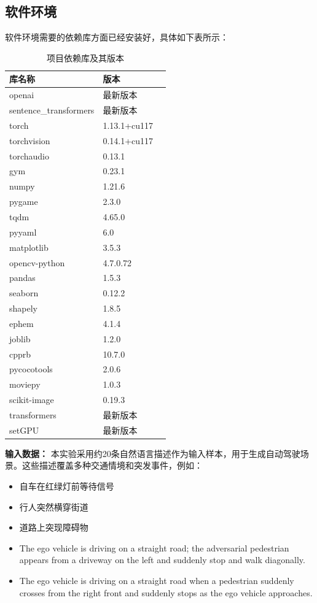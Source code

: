 \subsection*{软件环境}
软件环境需要的依赖库方面已经安装好，具体如下表所示：
	\begin{table}[H]
		\centering
			\begin{tabular}{lll}
			\hline
			\textbf{库名称} & \textbf{版本} \\
			\hline
			openai & 最新版本 \\
			sentence\_transformers & 最新版本 \\
			torch & 1.13.1+cu117 \\
			torchvision & 0.14.1+cu117 \\
			torchaudio & 0.13.1 \\
			gym & 0.23.1 \\
			numpy & 1.21.6 \\
			pygame & 2.3.0 \\
			tqdm & 4.65.0 \\
			pyyaml & 6.0 \\
			matplotlib & 3.5.3 \\
			opencv-python & 4.7.0.72 \\
			pandas & 1.5.3 \\
			seaborn & 0.12.2 \\
			shapely & 1.8.5 \\
			ephem & 4.1.4 \\
			joblib & 1.2.0 \\
			cpprb & 10.7.0 \\
			pycocotools & 2.0.6 \\
			moviepy & 1.0.3 \\
			scikit-image & 0.19.3 \\
			transformers & 最新版本 \\
			setGPU & 最新版本 \\
			\hline
		\end{tabular}
		\caption{项目依赖库及其版本}
		\label{tab:dependencies}
	\end{table}
	
\textbf{输入数据：} 本实验采用约20条自然语言描述作为输入样本，用于生成自动驾驶场景。这些描述覆盖多种交通情境和突发事件，例如：

\begin{itemize}[leftmargin=20pt]
	\item 自车在红绿灯前等待信号
	\item 行人突然横穿街道
	\item 道路上突现障碍物
	\item The ego vehicle is driving on a straight road; the adversarial pedestrian appears from a driveway on the left and suddenly stop and walk diagonally.
	\item The ego vehicle is driving on a straight road when a pedestrian suddenly crosses from the right front and suddenly stops as the ego vehicle approaches.
\end{itemize}

